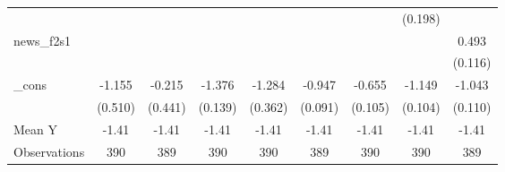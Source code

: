 {\begin{tabular}{l*{8}{c}}
            &                     &                     &                     &                     &                     &                     &     (0.198)         &                     \\
\addlinespace
news\_f2s1   &                     &                     &                     &                     &                     &                     &                     &       0.493\sym{***}\\
            &                     &                     &                     &                     &                     &                     &                     &     (0.116)         \\
\addlinespace
\_cons      &      -1.155\sym{**} &      -0.215         &      -1.376\sym{***}&      -1.284\sym{***}&      -0.947\sym{***}&      -0.655\sym{***}&      -1.149\sym{***}&      -1.043\sym{***}\\
            &     (0.510)         &     (0.441)         &     (0.139)         &     (0.362)         &     (0.091)         &     (0.105)         &     (0.104)         &     (0.110)         \\
\midrule
Mean Y      &       -1.41         &       -1.41         &       -1.41         &       -1.41         &       -1.41         &       -1.41         &       -1.41         &       -1.41         \\
Observations&         390         &         389         &         390         &         390         &         389         &         390         &         390         &         389         \\
\bottomrule
\end{tabular}
}

